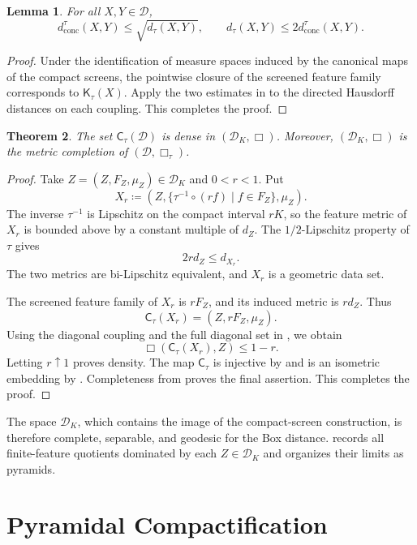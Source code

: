 \documentclass[11pt]{amsart}
\theoremstyle{plain}
\newtheorem{theorem}{Theorem}[section]
\newtheorem{lemma}[theorem]{Lemma}
\theoremstyle{definition}
\theoremstyle{remark}
\newcommand{\D}{\mathcal D}
\newcommand{\DK}{\mathcal D_K}
\newcommand{\Kc}{\mathsf K}
\newcommand{\dconc}{d_{\mathrm{conc}}}
\newcommand{\dtau}{d_{\tau}}
\begin{document}
\begin{lemma}
\label{lem:screened-topology}
For all $X,Y\in\D$,
\[
\dconc^\tau(X,Y)\leq\sqrt{\dtau(X,Y)},\qquad
\dtau(X,Y)\leq2\dconc^\tau(X,Y).
\]
\end{lemma}

\begin{proof}
Under the identification of measure spaces induced by the canonical maps of the compact screens, the pointwise closure of the screened feature family corresponds to $\Kc_\tau(X)$. Apply the two estimates in  to the directed Hausdorff distances on each coupling. This completes the proof.
\end{proof}

\begin{theorem}
\label{thm:screen-density}
The set $\mathsf C_\tau(\D)$ is dense in $(\DK,\Box)$. Moreover, $(\DK,\Box)$ is the metric completion of $(\D,\Box_\tau)$.
\end{theorem}

\begin{proof}
Take $Z=(Z,F_Z,\mu_Z)\in\DK$ and $0<r<1$. Put
\[
X_r\coloneqq
\left(Z,\{\tau^{-1}\circ(rf)\mid f\in F_Z\},\mu_Z\right).
\]
The inverse $\tau^{-1}$ is Lipschitz on the compact interval $rK$, so the feature metric of $X_r$ is bounded above by a constant multiple of $d_Z$. The $1/2$-Lipschitz property of $\tau$ gives
\[
2r d_Z\leq d_{X_r}.
\]
The two metrics are bi-Lipschitz equivalent, and $X_r$ is a geometric data set.

The screened feature family of $X_r$ is $rF_Z$, and its induced metric is $rd_Z$. Thus
\[
\mathsf C_\tau(X_r)=(Z,rF_Z,\mu_Z).
\]
Using the diagonal coupling and the full diagonal set in , we obtain
\[
\Box(\mathsf C_\tau(X_r),Z)\leq1-r.
\]
Letting $r\uparrow1$ proves density. The map $\mathsf C_\tau$ is injective by  and is an isometric embedding by . Completeness from  proves the final assertion. This completes the proof.
\end{proof}

The space $\DK$, which contains the image of the compact-screen construction, is therefore complete, separable, and geodesic for the Box distance.  records all finite-feature quotients dominated by each $Z\in\DK$ and organizes their limits as pyramids.

\section{Pyramidal Compactification}
\label{sec:pyramid-compactification}
\end{document}
